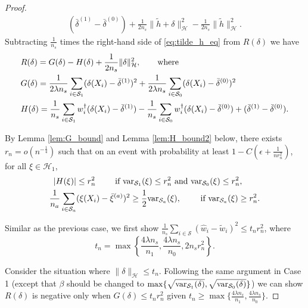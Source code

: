 \documentclass[12pt]{article}
\newcommand{\var}{\textnormal{var}}
\begin{document}
\begin{proof}
\begin{align*}
		(\bar{\delta}^{(1)} - \bar{\delta}^{(0)}) +
		\frac{1}{2 n_s} \| \tilde{h} + \delta \|_\mathcal{H}^2 -
		\frac{1}{2 n_s} \| \tilde{h} \|_\mathcal{H}^2
		.\end{align*}
	Subtracting $\frac{1}{n_s}$ times the right-hand side of \eqref{eq:tilde_h_eq} from $R(\delta)$ we have
	\begin{equation}
		\label{eq:R_G_H2}
		\begin{aligned}
			&R(\delta) = G(\delta) - H(\delta) +
			\frac{1}{2 n_s} 
			\| \delta \|_\mathcal{H}^2
			,
			\qquad \textnormal{where}
			\\&
			G(\delta) = 
			\frac{1}{2\lambda n_s} \sum_{i \in \mathcal{S}_1} (\delta(X_i) - \bar{\delta}^{(1)})^2 +
			\frac{1}{2\lambda n_s} \sum_{i \in \mathcal{S}_0} (\delta(X_i) - \bar{\delta}^{(0)})^2
			\\&
			H(\delta) = 
			\frac{1}{n_s} \sum_{i \in \mathcal{S}_1} w^\dagger_i(\delta(X_i) - \bar{\delta}^{(1)}) -
			\frac{1}{n_s} \sum_{i \in \mathcal{S}_0} w^\dagger_i(\delta(X_i) - \bar{\delta}^{(0)}) +
			(\bar{\delta}^{(1)} - \bar{\delta}^{(0)})
			.\end{aligned}
	\end{equation}
	
	
	By Lemma \ref{lem:G_bound} and Lemma \ref{lem:H_bound2} below, there exists $r_n = o(n^{-\frac{1}{4}})$ such that on an event with probability at least $1 - C(\epsilon + \frac{1}{n r_n^2})$, for all $\xi \in \mathcal{H}_1$,
	\begin{align}
		|H(\xi)| &\le r_n^2
		\hspace{2em}
		\text{ if }
		\var_{\mathcal{S}_1}(\xi) \le r_n^2
		\textnormal{ and }
		\var_{\mathcal{S}_0}(\xi) \le r_n^2,
		\label{eq:bound_H2}
		\\
		\frac{1}{n_a} \sum_{i \in \mathcal{S}_a} &(\xi(X_i) - \bar{\xi}^{(a)})^2
		\ge \frac{1}{2} \var_{\mathcal{S}_a}(\xi),
		\hspace{2em}\text{ if }
		\var_{\mathcal{S}_a}(\xi) \ge r_n^2
		\label{eq:bound_G2}
		.\end{align}
	
	Similar as the previous case, we first show $\frac{1}{n_s} \sum_{i \in \mathcal{S}} (\hat{w}_i - \tilde{w}_i)^2 \le t_n r_n^2$, where
	\begin{equation*}
		t_n = \max\left\{ \frac{4\lambda n_s}{n_1}, \frac{4\lambda n_s}{n_0}, 2 n_s r_n^2 \right\}
		.\end{equation*}
	
	Consider the situation where $\| \delta \|_\mathcal{H} \le t_n$. Following the same argument in Case 1 (except that $\beta$ should be changed to $\max\{\sqrt{\var_{\mathcal{S}_1}(\delta)}, \sqrt{\var_{\mathcal{S}_0}(\delta)}\}$) we can show $R(\delta)$ is negative only when $G(\delta) \le t_n r_n^2$ given $t_n \ge \max\{\frac{4\lambda n_s}{n_1}, \frac{4\lambda n_s}{n_0}\}$. 
	

\end{proof}
\end{document}
